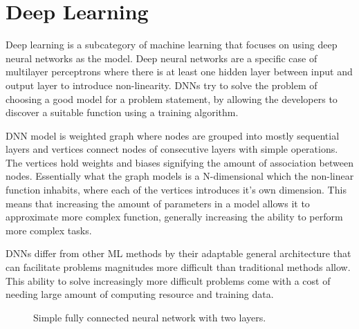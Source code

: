 \documentclass[12pt,a4paper,english
]{tunithesis}
\begin{document}
\section{Deep Learning}
Deep learning is a subcategory of machine learning that focuses on using deep neural networks as the model. Deep neural networks are a specific case of multilayer perceptrons where there is at least one hidden layer between input and output layer to introduce non-linearity. DNNs try to solve the problem of choosing a good model for a problem statement, by allowing the developers to discover a suitable function using a training algorithm.

DNN model is weighted graph where nodes are grouped into mostly sequential layers and vertices connect nodes of consecutive layers with simple operations. The vertices hold weights and biases signifying the amount of association between nodes. Essentially what the graph models is a N-dimensional which the non-linear function inhabits, where each of the vertices introduces it's own dimension.
This means that increasing the amount of parameters in a model allows it to approximate more complex function, generally increasing the ability to perform more complex tasks.~\cite{sze_efficient_2017}

DNNs differ from other ML methods by their adaptable general architecture that can facilitate problems magnitudes more difficult than traditional methods allow. This ability to solve increasingly more difficult problems come with a cost of needing large amount of computing resource and training data.

\begin{figure}
  \centering
{}
\caption{Simple fully connected neural network with two layers.}
\label{fig:fc-layer}
\end{figure}
\end{document}
